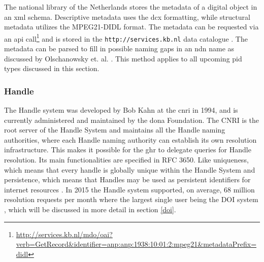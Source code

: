 The national library of the Netherlands stores the metadata of a digital object in an \gls{xml} schema. Descriptive metadata uses the \gls{dcx} formatting, while structural metadata utilizes the MPEG21-DIDL format. The metadata can be requested via an \gls{api} call\footnote{\url{http://services.kb.nl/mdo/oai?verb=GetRecord&identifier=anp:anp:1938:10:01:2:mpeg21&metadataPrefix=didl}} and is stored in the 
\texttt{http://services.kb.nl} data catalogue \cite{kb-urn}. The metadata can be parsed to fill in possible naming gaps in an \gls{ndn} name as discussed by Olschanowsky et. al. \cite{ndn-clim}. This method applies to all upcoming \gls{pid} types discussed in this section.

\subsubsection{Handle}\label{hndl}
The Handle system was developed by Bob Kahn at the \gls{cnri} in 1994, and is currently administered and maintained by the \gls{dona} Foundation. The CNRI is the root server of the Handle System and maintains all the Handle naming authorities, where each Handle naming authority can establish its own resolution infrastructure. This makes it possible for the \gls{ghr} to delegate queries for Handle resolution. 
Its main functionalities are specified in RFC 3650. Like uniqueness, which means that every handle is globally unique within the Handle System and persistence, which means that Handles may be used as persistent identifiers for internet resources \cite{rfc3650}. In 2015 the Handle system supported, on average, 68 million resolution requests per month where the largest single user being the DOI system \cite{hdl-us}, which will be discussed in more detail in section \ref{doi}. 

